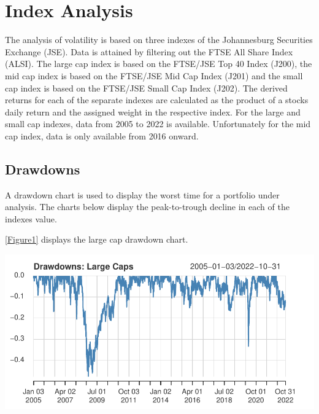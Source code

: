 \documentclass[11pt,preprint, authoryear]{elsarticle}
\let\origfigure\figure
\let\endorigfigure\endfigure
\renewenvironment{figure}[1][2] {
    \expandafter\origfigure\expandafter[H]
} {
    \endorigfigure
}
\numberwithin{equation}{section}
\numberwithin{figure}{section}
\numberwithin{table}{section}
\begin{document}
\hypertarget{index-analysis}{%
\section{\texorpdfstring{Index Analysis
\label{Index}}{Index Analysis }}\label{index-analysis}}

The analysis of volatility is based on three indexes of the Johannesburg
Securities Exchange (JSE). Data is attained by filtering out the FTSE
All Share Index (ALSI). The large cap index is based on the FTSE/JSE Top
40 Index (J200), the mid cap index is based on the FTSE/JSE Mid Cap
Index (J201) and the small cap index is based on the FTSE/JSE Small Cap
Index (J202). The derived returns for each of the separate indexes are
calculated as the product of a stocks daily return and the assigned
weight in the respective index. For the large and small cap indexes,
data from 2005 to 2022 is available. Unfortunately for the mid cap
index, data is only available from 2016 onward.

\hypertarget{drawdowns}{%
\subsection{Drawdowns}\label{drawdowns}}

A drawdown chart is used to display the worst time for a portfolio under
analysis. The charts below display the peak-to-trough decline in each of
the indexes value.

\ref{Figure1} displays the large cap drawdown chart.

\begin{figure}[H]

{\centering \includegraphics{Volatility-of-Shares_files/figure-latex/Figure1-1} 

}

\caption{Large Cap drawdown chart \label{Figure1}}\label{fig:Figure1}
\end{figure}
\end{document}
